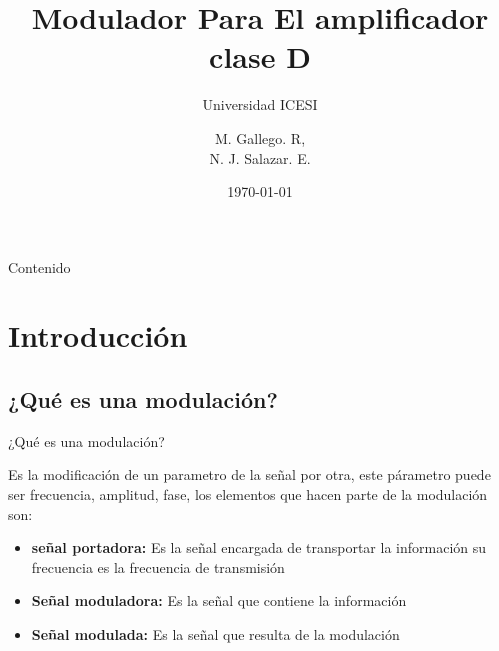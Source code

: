\documentclass{if-beamer}
\title[Modulador]{Modulador Para El amplificador clase D}
\subtitle{Universidad ICESI}
\author{M. Gallego. R, \\
N. J. Salazar. E.}
\institute[ICESI]{
}
\date{\today}
\begin{document}
\begin{frame}
  \titlepage
\end{frame}

\begin{frame}{Contenido}
  \tableofcontents
\end{frame}

\section{Introducción}
\subsection{¿Qué es una modulación?}
\begin{frame}{¿Qué es una modulación?}

Es la modificación de un parametro de la señal por otra, este 
párametro puede ser frecuencia, amplitud, fase, los elementos que hacen parte de la modulación son: 

\begin{itemize}
    \item \textbf{señal portadora: } Es la señal encargada de transportar la información su frecuencia es la frecuencia de transmisión 
    \item \textbf{Señal moduladora: } Es la señal que contiene la información 
    \item \textbf{Señal modulada: } Es la señal que resulta de la modulación 
\end{itemize}{}
\end{frame}{}
\end{document}

